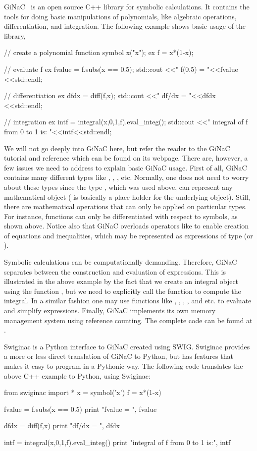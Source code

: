 GiNaC~\citep{BauerFrinkKreckel2000} is an open source C++ library for symbolic calculations. 
It contains the tools for doing basic manipulations of polynomials, like algebraic operations, 
differentiation, and integration. 
The following example shows basic usage of the library,  
\begin{c++}
  // create a polynomial function
  symbol x("x");
  ex f = x*(1-x);

  // evaluate f
  ex fvalue = f.subs(x == 0.5);
  std::cout <<" f(0.5) = "<<fvalue <<std::endl;

  // differentiation
  ex dfdx  = diff(f,x);
  std::cout <<" df/dx = "<<dfdx <<std::endl;

  // integration
  ex intf  = integral(x,0,1,f).eval_integ();
  std::cout <<" integral of f from 0 to 1 is: "<<intf<<std::endl;
\end{c++}
We will not go deeply into GiNaC here, but refer the reader to the 
GiNaC tutorial and reference which can be found on its webpage. There are, however, a few
issues we need to address to explain basic GiNaC usage. First of all, GiNaC 
contains many different types like , , , etc. 
Normally, one does not need to worry about these types since the type , which
was used above, can represent any mathematical object ( is basically a place-holder for the underlying 
object). Still, there are mathematical operations that can only be applied on particular 
types. For instance, functions can only be  differentiated with respect to
symbols, as shown above.  Notice also that GiNaC overloads operators
like \emp{==} to enable creation of equations and inequalities, which
may be represented as  expressions of type  (or ). 

Symbolic calculations can be computationally demanding. Therefore, GiNaC separates between 
the construction and evaluation of expressions. This is illustrated in the above example by
the fact that we create an integral object using the function , but we 
need to explicitly call the function  to compute the integral. In a similar
fashion one may use functions like , , , , 
and    etc. to evaluate and simplify expressions. 
Finally, GiNaC implements its own memory management system using reference counting.   
The complete code can be found at .

Swiginac is a Python interface to GiNaC created using SWIG.  
Swiginac provides a more or less direct translation of GiNaC to Python, 
but has features that makes it easy to program in a Pythonic way. 
The following code translates the above C++ example to Python, using Swiginac:
\begin{python}
from swiginac import *
x = symbol('x')
f = x*(1-x) 

fvalue = f.subs(x == 0.5)
print "fvalue = ", fvalue 

dfdx = diff(f,x)
print "df/dx = ", dfdx 

intf = integral(x,0,1,f).eval_integ()
print "integral of f from 0 to 1 is:", intf 
\end{python}

